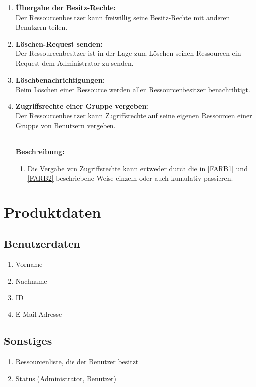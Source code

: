 \documentclass[parskip=full,11pt]{scrartcl}
\def\threedigits#1{%
  \ifnum#1<10 0\fi
  \ifnum#1<1 0\fi
  \number#1}
\begin{document}
\begin{enumerate}[label={\textbf{/F\protect\threedigits{\theenumi}0/}}, leftmargin=*, resume]
\item \label{FARB5} \textbf{Übergabe der Besitz-Rechte:}\\
Der Ressourcenbesitzer kann freiwillig seine Besitz-Rechte mit anderen Benutzern teilen. 
\item \label{FARB6} \textbf{Löschen-Request senden:}\\
Der Ressourcenbesitzer ist in der Lage zum Löschen seinen Ressourcen ein Request dem Administrator zu senden.
\item \label{FARB7} \colorbox{shadecolor} {\textbf{Löschbenachrichtigungen:}}\\
Beim Löschen einer Ressource werden allen Ressourcenbesitzer benachrihtigt.
\item \label{FARB8} \colorbox{shadecolor} {\textbf{Zugriffsrechte einer Gruppe vergeben:}}\\
Der Ressourcenbesitzer kann Zugriffsrechte auf seine eigenen Ressourcen einer Gruppe von Benutzern vergeben.\\\

\textbf{Beschreibung:}\\
\begin{enumerate}[label=(\arabic*), leftmargin=*]
\item Die Vergabe von Zugriffsrechte kann entweder durch die in \ref{FARB1} und \ref{FARB2} beschriebene Weise einzeln oder auch kumulativ passieren.
\end{enumerate}
\end{enumerate}


\section{Produktdaten}
\subsection{Benutzerdaten}
\begin{enumerate}[label={\textbf{/D\protect\threedigits{\theenumi}0/}}, leftmargin=*]
     		\item Vorname
     		\item Nachname
     		\item ID
     		\item E-Mail Adresse 
\end{enumerate}
     		 
\subsection{Sonstiges}
\begin{enumerate}[label={\textbf{/D\protect\threedigits{\theenumi}0/}}, leftmargin=*, resume]
		\item Ressourcenliste, die der Benutzer besitzt
        	\item Status (Administrator, Benutzer)     
\end{enumerate}
\end{document}
